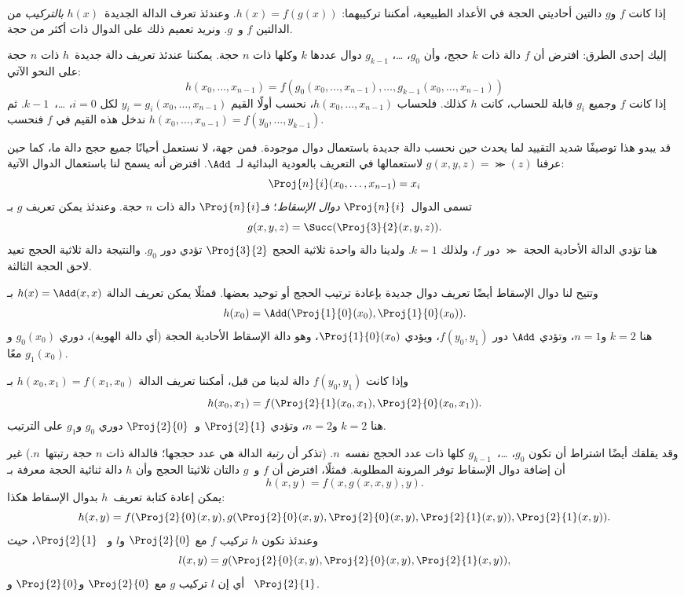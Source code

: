 \documentclass[../../../include/open-logic-section]{subfiles}
\begin{document}

إذا كانت $f$ و$g$ دالتين أحاديتي الحجة في الأعداد الطبيعية، أمكننا
تركيبهما: $h(x)=f(g(x))$. وعندئذ تعرف الدالة الجديدة~$h(x)$
\emph{بالتركيب} من الدالتين $f$ و~$g$. ونريد تعميم ذلك على الدوال ذات
أكثر من حجة.

إليك إحدى الطرق: افترض أن $f$ دالة ذات $k$ حجج، وأن $g_0$، …،
$g_{k-1}$ دوال عددها $k$ وكلها ذات $n$ حجة. يمكننا عندئذ تعريف دالة
جديدة~$h$ ذات $n$ حجة على النحو الآتي:
\[
h(x_0, \dots, x_{n-1}) =
f(g_0(x_0, \dots, x_{n-1}), \dots, g_{k-1}(x_0, \dots, x_{n-1}))
\]
إذا كانت $f$ وجميع $g_i$ قابلة للحساب، كانت $h$ كذلك. فلحساب
$h(x_0,\dots,x_{n-1})$، نحسب أولًا القيم
$y_i=g_i(x_0,\dots,x_{n-1})$ لكل $i=0$، …،~$k-1$. ثم ندخل هذه
القيم في $f$ فنحسب
$h(x_0,\dots,x_{n-1})=f(y_0,\dots,y_{k-1})$.

قد يبدو هذا توصيفًا شديد التقييد لما يحدث حين نحسب دالة جديدة باستعمال
دوال موجودة. فمن جهة، لا نستعمل أحيانًا جميع حجج دالة ما، كما حين عرفنا
$g(x,y,z)=\Succ(z)$ لاستعمالها في التعريف بالعودية البدائية لـ~$\Add$.
افترض أنه يسمح لنا باستعمال الدوال الآتية:
\[
\Proj{n}{i}(x_0, \dots, x_{n-1}) = x_i
\]
تسمى الدوال~$\Proj{n}{i}$ \emph{دوال الإسقاط}؛ فـ$\Proj{n}{i}$ دالة
ذات $n$ حجة. وعندئذ يمكن تعريف $g$ بـ
\[
g(x, y, z) = \Succ(\Proj{3}{2}(x, y, z)).
\]
هنا تؤدي الدالة الأحادية الحجة $\Succ$ دور $f$، ولذلك $k=1$. ولدينا
دالة واحدة ثلاثية الحجج $\Proj{3}{2}$ تؤدي دور $g_0$. والنتيجة دالة
ثلاثية الحجج تعيد لاحق الحجة الثالثة.

وتتيح لنا دوال الإسقاط أيضًا تعريف دوال جديدة بإعادة ترتيب الحجج أو
توحيد بعضها. فمثلًا يمكن تعريف الدالة $h(x)=\Add(x,x)$ بـ
\[
h(x_0) = \Add(\Proj{1}{0}(x_0),\Proj{1}{0}(x_0)).
\]
هنا $k=2$ و$n=1$، وتؤدي $\Add$ دور $f(y_0,y_1)$، ويؤدي
$\Proj{1}{0}(x_0)$، وهو دالة الإسقاط الأحادية الحجة (أي دالة الهوية)،
دوري $g_0(x_0)$ و$g_1(x_0)$ معًا.

وإذا كانت $f(y_0,y_1)$ دالة لدينا من قبل، أمكننا تعريف الدالة
$h(x_0,x_1)=f(x_1,x_0)$ بـ
\[
h(x_0, x_1) = f(\Proj{2}{1}(x_0, x_1),\Proj{2}{0}(x_0, x_1)).
\]
هنا $k=2$ و$n=2$، وتؤدي $\Proj{2}{1}$ و~$\Proj{2}{0}$ دوري
$g_0$ و$g_1$ على الترتيب.

وقد يقلقك أيضًا اشتراط أن تكون $g_0$، …،~$g_{k-1}$ كلها ذات عدد
الحجج نفسه~$n$. (تذكر أن \emph{رتبة} الدالة هي عدد حججها؛ فالدالة ذات
$n$ حجة رتبتها~$n$.) غير أن إضافة دوال الإسقاط توفر المرونة المطلوبة.
فمثلًا، افترض أن $f$ و~$g$ دالتان ثلاثيتا الحجج وأن $h$ دالة ثنائية
الحجة معرفة بـ
\[
h(x,y) = f(x,g(x,x,y),y).
\]
يمكن إعادة كتابة تعريف~$h$ بدوال الإسقاط هكذا:
\[
h(x,y) = f(\Proj{2}{0}(x,y), g(\Proj{2}{0}(x,y), \Proj{2}{0}(x,y),
\Proj{2}{1}(x,y)), \Proj{2}{1}(x,y)).
\]
وعندئذ تكون $h$ تركيب $f$ مع $\Proj{2}{0}$ و$l$ و
~$\Proj{2}{1}$، حيث
\[
l(x,y) = g(\Proj{2}{0}(x,y),\Proj{2}{0}(x,y),\Proj{2}{1}(x,y)),
\]
أي إن $l$ تركيب $g$ مع $\Proj{2}{0}$ و$\Proj{2}{0}$ و
~$\Proj{2}{1}$.
\end{document}
